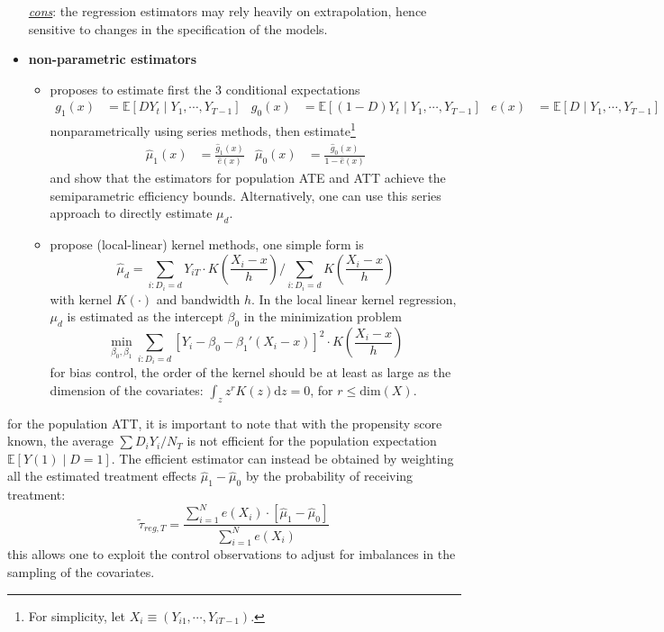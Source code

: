 \documentclass[twoside]{article}
\begin{document}
\begin{itemize}
    \underline{\textit{cons}}: the regression estimators may rely heavily on extrapolation, hence sensitive to changes in the specification of the models.
    \item \textbf{non-parametric estimators}
    \begin{itemize}
        \item \citet{hahn1998role} proposes to estimate first the 3 conditional expectations
        \begin{align*}
            g_1(x) &= \mathbb{E}\left[DY_t\mid Y_{1},\cdots,Y_{T-1}\right] & g_0(x) &= \mathbb{E}\left[(1-D)Y_t\mid Y_{1},\cdots,Y_{T-1}\right] & e(x)&= \mathbb{E}\left[D\mid Y_{1},\cdots,Y_{T-1}\right]
        \end{align*}
        nonparametrically using series methods, then estimate\footnote{For simplicity, let $X_i \equiv \left(Y_{i1},\cdots,Y_{iT-1}\right)$.}
        \begin{align*}
            \hat{\mu}_1(x) &= \frac{\hat{g}_1(x)}{\hat{e}(x)} & \hat{\mu}_0(x) &= \frac{\hat{g}_0(x)}{1-\hat{e}(x)}
        \end{align*}
        and show that the estimators for population ATE and ATT achieve the semiparametric efficiency bounds. Alternatively, one can use this series approach to directly estimate $\mu_d$.
        \item \citet{heckman1998characterizing,heckman1998matching} propose (local-linear) kernel methods, one simple form is 
        \begin{equation*}
            \hat{\mu}_d = \sum_{i:D_i=d} Y_{iT}\cdot K\left(\frac{X_i-x}{h}\right)/\sum_{i:D_i=d}K\left(\frac{X_i-x}{h}\right)
        \end{equation*}
        with kernel $K(\cdot)$ and bandwidth $h$. In the local linear kernel regression, $\mu_d$ is estimated as the intercept $\beta_0$ in the minimization problem 
        \begin{equation*}
            \min_{\beta_0,\beta_1} \sum_{i:D_i=d} \left[Y_i-\beta_0-\beta_1'(X_i-x)\right]^2 \cdot K\left(\frac{X_i-x}{h}\right)
        \end{equation*}
        for bias control, the order of the kernel should be at least as large as the dimension of the covariates: $\int_z z^{r}K(z)\mathrm{d}z=0$, for $r\leq \mathrm{dim}(X)$.
    \end{itemize}
\end{itemize}
for the population ATT, it is important to note that with the propensity score known, the average $\sum D_iY_i/N_T$ is not efficient for the population expectation $\mathbb{E}\left[Y(1)\mid D=1\right]$. The efficient estimator can instead be obtained by weighting all the estimated treatment effects $\hat{\mu}_1-\hat{\mu}_0$ by the probability of receiving treatment:
\begin{equation*}
    \tilde{\tau}_{reg,T} = \frac{\sum^N_{i=1}e(X_i)\cdot \left[\hat{\mu}_1 - \hat{\mu}_0\right]}{\sum^N_{i=1}e(X_i)}
\end{equation*}
this allows one to exploit the control observations to adjust for imbalances in the sampling of the covariates.
\end{document}
